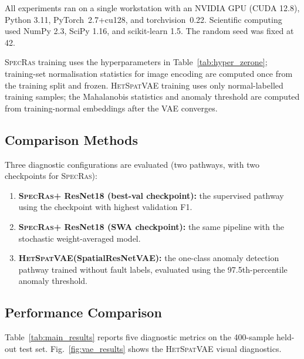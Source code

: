 \documentclass[preprint,12pt,3p]{elsarticle}
\newcommand{\zerone}{\textsc{SpecRas}\xspace}      %
\newcommand{\hetspatvae}{\textsc{HetSpatVAE}\xspace} %
\newcommand{\hczv}{\hetspatvae}                    %
\begin{document}
All experiments ran on a single workstation with an NVIDIA GPU
(CUDA 12.8), Python 3.11, PyTorch~2.7\allowbreak+cu128, and torchvision~0.22.
Scientific computing used NumPy 2.3, SciPy 1.16, and scikit-learn 1.5.
The random seed was fixed at 42.

\zerone training uses the hyperparameters in Table~\ref{tab:hyper_zerone};
training-set normalisation statistics for image encoding are computed
once from the training split and frozen.
\hczv training uses only normal-labelled training samples; the
Mahalanobis statistics and anomaly threshold are computed from
training-normal embeddings after the VAE converges.

\subsection{Comparison Methods}
\label{sec:baselines}

Three diagnostic configurations are evaluated (two pathways, with two checkpoints for \zerone):

\begin{enumerate}
  \item \textbf{\zerone + ResNet18 (best-val checkpoint):} the supervised
    pathway using the checkpoint with highest validation F1.
  \item \textbf{\zerone + ResNet18 (SWA checkpoint):} the same pipeline
    with the stochastic weight-averaged model.
  \item \textbf{\hczv (SpatialResNetVAE):} the one-class anomaly
    detection pathway trained without fault labels, evaluated using
    the 97.5th-percentile anomaly threshold.
\end{enumerate}

\subsection{Performance Comparison}
\label{sec:results}

Table~\ref{tab:main_results} reports five diagnostic metrics on the
400-sample held-out test set.
Fig.~\ref{fig:vae_results} shows the \hczv visual diagnostics.
\end{document}
